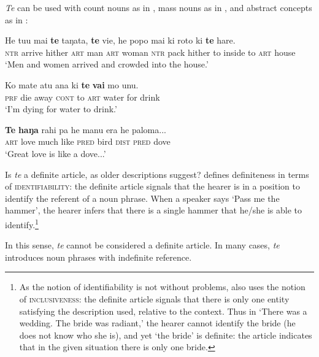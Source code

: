 \textit{Te} can be used with count nouns as in , mass nouns as in , and abstract concepts as in :

\ea\label{ex:5.28}
\gll He tu{\ꞌ}u mai \textbf{te} taŋata, \textbf{te} vi{\ꞌ}e, he popo mai ki roto ki \textbf{te} hare.\\
\textsc{ntr} arrive hither \textsc{art} man \textsc{art} woman \textsc{ntr} pack hither to inside to \textsc{art} house\\

\glt 
‘Men and women arrived and crowded into the house.’ \textstyleExampleref{[Ley-5-34.009]}
\z

\ea\label{ex:5.29}
\gll Ko mate atu {\ꞌ}ana ki \textbf{te} \textbf{vai} mo unu.\\
\textsc{prf} die away \textsc{cont} to \textsc{art} water for drink\\

\glt 
‘I’m dying for water to drink.’ \textstyleExampleref{[R303.032]} 
\z

\ea\label{ex:5.30}
\gll \textbf{Te} \textbf{haŋa} rahi pa he manu era he paloma...\\
\textsc{art} love much like \textsc{pred} bird \textsc{dist} \textsc{pred} dove\\

\glt
‘Great love is like a dove...’ \textstyleExampleref{[R222.036–037]}
\z

Is \textit{te} a definite article, as older descriptions suggest? \citet{Lyons1999} defines definiteness in terms of \textsc{identifiability}: the definite article signals that the hearer is in a position to identify the referent of a noun phrase. When a speaker says ‘Pass me the hammer’, the hearer infers that there is a single hammer that he/she is able to identify.\footnote{\label{fn:251}As the notion of identifiability is not without problems, \citet{Lyons1999} also uses the notion of \textsc{inclusiveness}: the definite article signals that there is only one entity satisfying the description used, relative to the context. Thus in ‘There was a wedding. The bride was radiant,’ the hearer cannot identify the bride (he does not know who she is), and yet ‘the bride’ is definite: the article indicates that in the given situation there is only one bride.}

In this sense, \textit{te} cannot be considered a definite article. In many cases, \textit{te} introduces noun phrases with indefinite reference.

